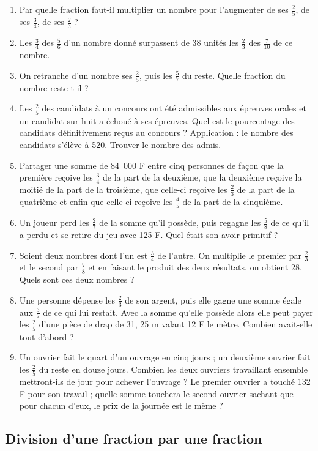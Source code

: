 \documentclass[12 pt]{extarticle}
\theoremstyle{plain}
\begin{document}
\begin{enumerate}
  \item Par quelle fraction faut-il multiplier un nombre pour l'augmenter de ses $\frac25$, de ses $\frac34$, de ses $\frac23$ ? 
  \item Les $\frac34$ des $\frac56$ d'un nombre donné surpassent de 38 unités les $\frac23$ des $\frac7{10}$ de ce nombre. 
  \item On retranche d'un nombre ses $\frac25$,
  puis les $\frac57$ du reste. Quelle fraction du nombre reste-t-il ? 
  \item Les $\frac25$ des candidats à un concours ont été admissibles aux épreuves orales et un candidat sur huit a échoué à ses épreuves. Quel est le pourcentage 
  des candidats définitivement reçus au concours ? 
  Application : le nombre des candidats s'élève à 520. Trouver le nombre des admis.
  \item Partager une somme de 84~000 F entre cinq personnes de façon que la première reçoive les $\frac34$ de la part de la deuxième, 
  que la deuxième reçoive la moitié de la part de la troisième, 
  que celle-ci reçoive les $\frac23$ de la part de la quatrième et enfin que celle-ci reçoive les $\frac45$
  de la part de la cinquième. 
  \item Un joueur perd les $\frac27$ de la somme qu'il 
  possède, puis regagne les $\frac58$ de ce qu'il a perdu et se retire du jeu avec 125 F. Quel était son avoir primitif ? 
  \item Soient deux nombres dont l'un est $\frac34$ de 
  l'autre. On multiplie le premier par $\frac23$ et le second par $\frac78$ et en faisant le produit des deux résultats, on obtient 28. Quels sont ces deux nombres ? 
  \item Une personne dépense les $\frac23$ de son argent, puis elle gagne une somme égale aux $\frac37$
  de ce qui lui restait. Avec la somme qu'elle possède alors elle peut payer les $\frac25$ d'une pièce de drap de 31, 25 m valant 12 F le mètre. Combien avait-elle tout d'abord ? 
  \item Un ouvrier fait le quart d'un ouvrage en cinq jours ; un deuxième ouvrier fait les $\frac25$ du reste en douze jours. Combien les deux ouvriers travaillant ensemble mettront-ils de jour pour achever l'ouvrage ? Le premier ouvrier a touché 132 F pour son travail ; quelle somme touchera le second ouvrier sachant que pour chacun d'eux, le prix de la journée est le même ? 
 \end{enumerate}

 
 \subsection{Division d'une fraction par une fraction}
 
\end{document}
